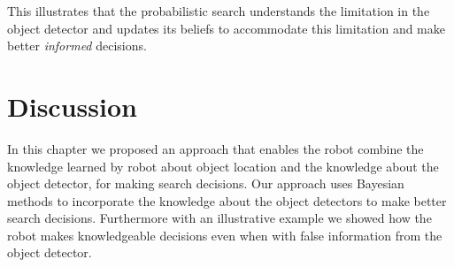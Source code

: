 This illustrates that the probabilistic search understands the limitation in the object detector and updates its beliefs to accommodate this limitation and make better \emph{informed} decisions.  


\section{Discussion}
In this chapter we proposed an approach that enables the robot combine the knowledge learned by robot about object location and the knowledge about the object detector, for making search decisions. Our approach uses Bayesian methods to incorporate the knowledge about the object detectors to make better search decisions. Furthermore with an illustrative example we showed how the robot makes knowledgeable decisions even when with false information from the object detector.
